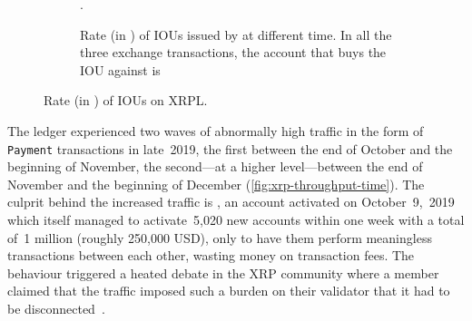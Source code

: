 \begin{figure}[tb]
\begin{subfigure}[b]{\linewidth}
         \caption{Rate (in ) of  IOUs issued by  at different time. In all the three exchange transactions, the account that buys the  IOU against  is }.
         \label{fig:xchangetime}
     \end{subfigure}
     \vspace{-1cm}
        \caption{Rate (in ) of  IOUs on XRPL.}
        \label{tab:btcrate}
\end{figure}


The ledger experienced two waves of abnormally high traffic in the form of \texttt{Payment} transactions in late~2019, the first between the end of October and the beginning of November, the second---at a higher level---between the end of November and the beginning of December (\autoref{fig:xrp-throughput-time}). 
The culprit behind the increased traffic is , an account activated on October~9,~2019 which itself managed to activate~5,020 new accounts within one week with a total of~1 million  (roughly 250,000 USD), only to have them perform meaningless transactions between each other, wasting money on transaction fees. 
The behaviour triggered a heated debate in the XRP community where a member claimed that the traffic imposed such a burden on their validator that it had to be disconnected~\cite{Tulo2019}.




